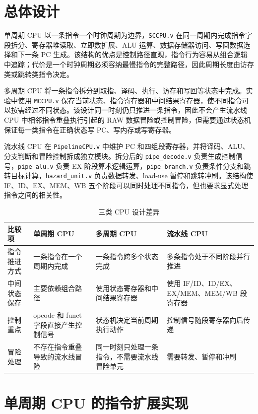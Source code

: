 \documentclass[UTF8,a4paper,12pt]{ctexart}
\begin{document}
\section{总体设计}

单周期 CPU 以一条指令一个时钟周期为边界，\texttt{SCCPU.v} 在同一周期内完成指令字段拆分、寄存器堆读取、立即数扩展、ALU 运算、数据存储器访问、写回数据选择和下一条 PC 生成。该结构的优点是控制路径直观，指令行为容易从组合逻辑中追踪；代价是一个时钟周期必须容纳最慢指令的完整路径，因此周期长度由访存类或跳转类指令决定。

多周期 CPU 将一条指令拆分到取指、译码、执行、访存和写回等状态中完成。实验中使用 \texttt{MCCPU.v} 保存当前状态、指令寄存器和中间结果寄存器，使不同指令可以按需经过不同状态。该设计同一时刻仍只推进一条指令，因此不会产生流水线 CPU 中相邻指令重叠执行引起的 RAW 数据冒险或控制冒险，但需要通过状态机保证每一类指令在正确状态写 PC、写内存或写寄存器。

流水线 CPU 在 \texttt{PipelineCPU.v} 中维护 PC 和四组段寄存器，并将译码、ALU、分支判断和冒险控制拆成独立模块。拆分后的 \texttt{pipe\_decode.v} 负责生成控制信号，\texttt{pipe\_alu.v} 负责 EX 阶段算术逻辑运算，\texttt{pipe\_branch.v} 负责条件分支和跳转目标计算，\texttt{hazard\_unit.v} 负责数据转发、load-use 暂停和跳转冲刷。该结构使 IF、ID、EX、MEM、WB 五个阶段可以同时处理不同指令，但也要求显式处理指令之间的相关性。

\begin{table}[H]
\centering
\caption{三类 CPU 设计差异}
\begin{tabular}{p{}p{}p{}p{}}
\toprule
比较项 & 单周期 CPU & 多周期 CPU & 流水线 CPU \\
\midrule
指令推进方式 & 一条指令在一个周期内完成 & 一条指令跨多个状态完成 & 多条指令处于不同阶段并行推进 \\
中间状态保存 & 主要依赖组合路径 & 使用状态寄存器和中间结果寄存器 & 使用 IF/ID、ID/EX、EX/MEM、MEM/WB 段寄存器 \\
控制重点 & opcode 和 funct 字段直接产生控制信号 & 状态机决定当前周期执行动作 & 控制信号随段寄存器向后传递 \\
冒险处理 & 不存在指令重叠导致的流水线冒险 & 同一时刻只处理一条指令，不需要流水线冒险单元 & 需要转发、暂停和冲刷 \\
\bottomrule
\end{tabular}
\end{table}

\section{单周期 CPU 的指令扩展实现}
\end{document}
